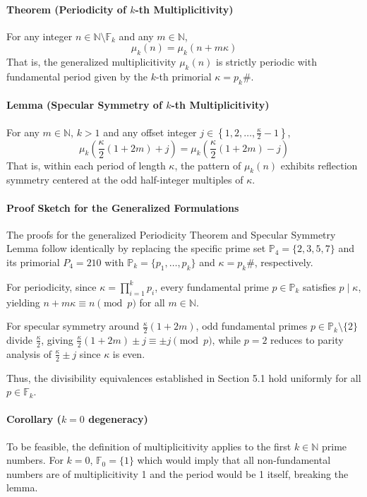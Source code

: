 \documentclass{article}
\begin{document}
\paragraph{Theorem (Periodicity of $k$-th Multiplicitivity)} 
For any integer $n \in \mathbb{N} \setminus \mathbb{F}_k$ and any $m \in \mathbb{N}$,
\[
\mu_k(n) = \mu_k(n + m\kappa)
\]
That is, the generalized multiplicitivity $\mu_k(n)$ is strictly periodic with fundamental period given by the $k$-th primorial $\kappa = p_k\#$.

\paragraph{Lemma (Specular Symmetry of $k$-th Multiplicitivity)} 
For any $m \in \mathbb{N}$, $k>1$ and any offset integer $j \in \left\{1, 2, \dots, \frac{\kappa}{2} - 1\right\}$,
\[
\mu_k\left(\frac{\kappa}{2}(1 + 2m) + j\right) = \mu_k\left(\frac{\kappa}{2}(1 + 2m) - j\right)
\]
That is, within each period of length $\kappa$, the pattern of $\mu_k(n)$ exhibits reflection symmetry centered at the odd half-integer multiples of $\kappa$.

\paragraph{Proof Sketch for the Generalized Formulations}
The proofs for the generalized Periodicity Theorem and Specular Symmetry Lemma follow identically by replacing the specific prime set $\mathbb{P}_4 = \{2, 3, 5, 7\}$ and its primorial $P_4 = 210$ with $\mathbb{P}_k = \{p_1, \dots, p_k\}$ and $\kappa = p_k\#$, respectively. 


For periodicity, since $\kappa = \prod_{i=1}^k p_i$, every fundamental prime $p \in \mathbb{P}_k$ satisfies $p \mid \kappa$, yielding $n + m\kappa \equiv n \pmod p$ for all $m \in \mathbb{N}$. 


For specular symmetry around $\frac{\kappa}{2}(1 + 2m)$, odd fundamental primes $p \in \mathbb{P}_k \setminus \{2\}$ divide $\frac{\kappa}{2}$, giving $\frac{\kappa}{2}(1 + 2m) \pm j \equiv \pm j \pmod p$, while $p = 2$ reduces to parity analysis of $\frac{\kappa}{2} \pm j$ since $\kappa$ is even. 


Thus, the divisibility equivalences established in Section 5.1 hold uniformly for all $p \in \mathbb{F}_k$.

\paragraph{Corollary ($k=0$ degeneracy)} To be feasible, the definition of multiplicitivity applies to the first $k\in\mathbb{N}$ prime numbers. For $k=0$, $\mathbb{F}_0=\{1\}$ which would imply that all non-fundamental numbers are of multiplicitivity 1 and the period would be 1 itself, breaking the lemma.
\end{document}
